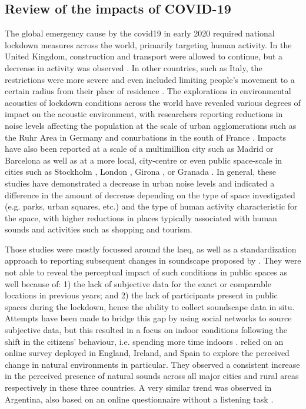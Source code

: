 \subsection{Review of the impacts of COVID-19}
 \label{sec:covidReview}
 The global emergency cause by the \gls{covid19} in early 2020 required national lockdown measures across the world, primarily targeting human activity. In the United Kingdom, construction and transport were allowed to continue, but a decrease in activity was observed \citep{Hadjidemetriou2020impact}. In other countries, such as Italy, the restrictions were more severe and even included limiting people's movement to a certain radius from their place of residence \citep{Ren2020Pandemic}. The explorations in environmental acoustics of lockdown conditions across the world have revealed various degrees of impact on the acoustic environment, with researchers reporting reductions in noise levels affecting the population at the scale of urban agglomerations such as the Ruhr Area in Germany \citep{Hornberg2021Impact} and conurbations in the south of France \citep{Munoz2020Lockdown}. Impacts have also been reported at a scale of a multimillion city such as Madrid \citep{Asensio2020Changes} or Barcelona \citep{BonetSola2021Soundscape} as well as at a more local, city-centre or even public space-scale in cities such as Stockholm \citep{Rumpler2021Noise}, London \citep{Aletta2020Assessing}, Girona \citep{AlsinaPages2021Changes}, or Granada \citep{VidaManzano2021sound}. In general, these studies have demonstrated a decrease in urban noise levels and indicated a difference in the amount of decrease depending on the type of space investigated (e.g. parks, urban squares, etc.) and the type of human activity characteristic for the space, with higher reductions in places typically associated with human sounds and activities such as shopping and tourism.

 Those studies were mostly focussed around the \gls{laeq}, as well as a standardization approach to reporting subsequent changes in soundscape proposed by \citet{Asensio2020Taxonomy}. They were not able to reveal the perceptual impact of such conditions in public spaces as well because of: 1) the lack of subjective data for the exact or comparable locations in previous years; and 2) the lack of participants present in public spaces during the lockdown, hence the ability to collect soundscape data in situ. Attempts have been made to bridge this gap by using social networks to source subjective data, but this resulted in a focus on indoor conditions following the shift in the citizens' behaviour, i.e. spending more time indoors \citep{Bartalucci2021survey,Lee2021Attitudes}. \citet{GarridoCumbrera2021Perceptions} relied on an online survey deployed in England, Ireland, and Spain to explore the perceived change in natural environments in particular. They observed a consistent increase in the perceived presence of natural sounds across all major cities and rural areas respectively in these three countries. A very similar trend was observed in Argentina, also based on an online questionnaire without a listening task \citep{Maggi2021Perception}. 
 
